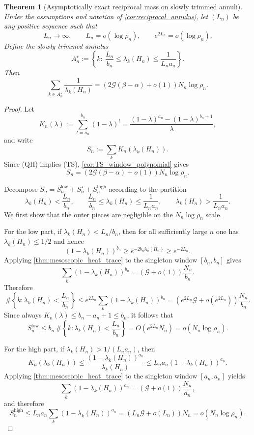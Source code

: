 \documentclass[reqno]{amsart}
\numberwithin{equation}{section}
\newtheorem{theorem}{Theorem}[section]
\theoremstyle{definition}
\theoremstyle{remark}
\newcommand{\Cref}[1]{\autoref{#1}}
\newcommand{\cG}{\mathcal{G}}
\begin{document}
\begin{theorem}[Asymptotically exact reciprocal mass on slowly trimmed annuli]\label{thm:trimmed_reciprocal_annulus}
Under the assumptions and notation of \Cref{cor:reciprocal_annulus}, let $(L_n)$ be any positive sequence such that
\[
  L_n\longrightarrow\infty,
  \qquad
  L_n=o(\log\rho_n),
  \qquad
  e^{2L_n}=o(\log\rho_n).
\]
Define the slowly trimmed annulus
\[
  A_n^\star
  :=
  \left\{
    k:\ \frac{L_n}{b_n}\le \lambda_k(H_n)\le \frac{1}{L_n a_n}
  \right\}.
\]
Then
\[
  \sum_{k\in A_n^\star}\frac{1}{\lambda_k(H_n)}
  =
  \left(2\cG(\beta-\alpha)+o(1)\right)N_n\log\rho_n.
\]
\end{theorem}

\begin{proof}
Let
\[
  K_n(\lambda)
  :=
  \sum_{t=a_n}^{b_n}(1-\lambda)^t
  =
  \frac{(1-\lambda)^{a_n}-(1-\lambda)^{b_n+1}}{\lambda},
\]
and write
\[
  S_n:=\sum_k K_n(\lambda_k(H_n)).
\]
Since \textup{(QH)} implies \textup{(TS)}, \Cref{cor:TS_window_polynomial} gives
\[
  S_n
  =
  \left(2\cG(\beta-\alpha)+o(1)\right)N_n\log\rho_n.
\]

Decompose $S_n=S_n^{\mathrm{low}}+S_n^{\star}+S_n^{\mathrm{high}}$ according to the partition
\[
  \lambda_k(H_n)<\frac{L_n}{b_n},
  \qquad
  \frac{L_n}{b_n}\le \lambda_k(H_n)\le \frac{1}{L_n a_n},
  \qquad
  \lambda_k(H_n)>\frac{1}{L_n a_n}.
\]
We first show that the outer pieces are negligible on the $N_n\log\rho_n$ scale.

For the low part, if $\lambda_k(H_n)<L_n/b_n$, then for all sufficiently large $n$ one has $\lambda_k(H_n)\le 1/2$ and hence
\[
  (1-\lambda_k(H_n))^{b_n}\ge e^{-2b_n\lambda_k(H_n)}\ge e^{-2L_n}.
\]
Applying \Cref{thm:mesoscopic_heat_trace} to the singleton window $[b_n,b_n]$ gives
\[
  \sum_k (1-\lambda_k(H_n))^{b_n}
  =
  \left(\cG+o(1)\right)\frac{N_n}{b_n}.
\]
Therefore
\[
  \#\left\{k:\lambda_k(H_n)<\frac{L_n}{b_n}\right\}
  \le
  e^{2L_n}\sum_k (1-\lambda_k(H_n))^{b_n}
  =
  \left(e^{2L_n}\cG+o(e^{2L_n})\right)\frac{N_n}{b_n}.
\]
Since always $K_n(\lambda)\le b_n-a_n+1\le b_n$, it follows that
\[
  S_n^{\mathrm{low}}
  \le
  b_n\,\#\left\{k:\lambda_k(H_n)<\frac{L_n}{b_n}\right\}
  =
  O(e^{2L_n}N_n)
  =
  o(N_n\log\rho_n).
\]

For the high part, if $\lambda_k(H_n)>1/(L_n a_n)$, then
\[
  K_n(\lambda_k(H_n))
  \le
  \frac{(1-\lambda_k(H_n))^{a_n}}{\lambda_k(H_n)}
  \le
  L_n a_n (1-\lambda_k(H_n))^{a_n}.
\]
Applying \Cref{thm:mesoscopic_heat_trace} to the singleton window $[a_n,a_n]$ yields
\[
  \sum_k (1-\lambda_k(H_n))^{a_n}
  =
  \left(\cG+o(1)\right)\frac{N_n}{a_n},
\]
and therefore
\[
  S_n^{\mathrm{high}}
  \le
  L_n a_n\sum_k (1-\lambda_k(H_n))^{a_n}
  =
  (L_n\cG+o(L_n))N_n
  =
  o(N_n\log\rho_n).
\]


\end{proof}
\end{document}
